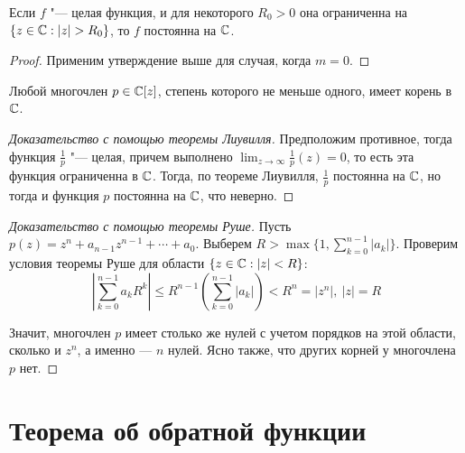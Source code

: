 \begin{corollary}
	Если $f$ "--- целая функция, и для некоторого $R_0 > 0$ она ограниченна на $\{z \in \mathbb{C}: |z| > R_0\}$, то $f$ постоянна на $\mathbb{C}$.
\end{corollary}

\begin{proof}
	Применим утверждение выше для случая, когда $m = 0$.
\end{proof}

\begin{theorem}
	Любой многочлен $p \in \mathbb{C}[z]$, степень которого не меньше одного, имеет корень в $\mathbb{C}$.
\end{theorem}

\begin{proof}[Доказательство с помощью теоремы Лиувилля]
	Предположим противное, тогда функция $\frac 1p$ "--- целая, причем выполнено $\lim_{z \to \infty} \frac1p(z) = 0$, то есть эта функция ограниченна в $\mathbb{C}$. Тогда, по теореме Лиувилля, $\frac 1p$ постоянна на $\mathbb{C}$, но тогда и функция $p$ постоянна на $\mathbb{C}$, что неверно.
\end{proof}

\begin{proof}[Доказательство с помощью теоремы Руше]
	Пусть $p(z) = z^n + a_{n-1}z^{n-1} + \dotsb + a_0$. Выберем $R > \max\{1, \sum_{k = 0}^{n-1} |a_k|\}$. Проверим условия теоремы Руше для области $\{z \in \mathbb{C}: |z| < R\}$: 
	\[\left|\sum_{k = 0}^{n-1}a_kR^k\right| \le R^{n-1}\left(\sum_{k = 0}^{n-1}|a_k|\right) < R^n = |z^n|,~|z| = R\]
	
	Значит, многочлен $p$ имеет столько же нулей с учетом порядков на этой области, сколько и $z^n$, а именно --- $n$ нулей. Ясно также, что других корней у многочлена $p$ нет.
\end{proof}

\section{Теорема об обратной функции}

